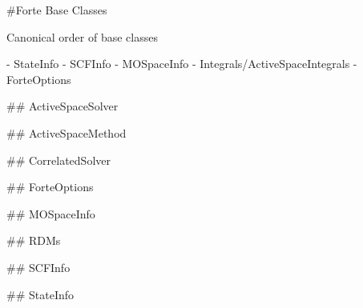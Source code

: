 \#\+Forte Base Classes

Canonical order of base classes \begin{DoxyVerb}- StateInfo 
- SCFInfo 
- MOSpaceInfo 
- Integrals/ActiveSpaceIntegrals 
- ForteOptions
\end{DoxyVerb}



\begin{DoxyItemize}
\item \#\# Active\+Space\+Solver
\item \#\# Active\+Space\+Method
\item \#\# Correlated\+Solver
\item \#\# Forte\+Options
\item \#\# M\+O\+Space\+Info
\item \#\# R\+D\+Ms
\item \#\# S\+C\+F\+Info
\item \#\# State\+Info 
\end{DoxyItemize}